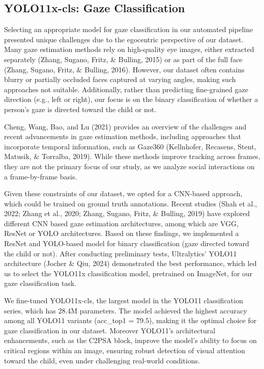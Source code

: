 \documentclass[
  man,floatsintext]{apa6}
\begin{document}
\subsection{YOLO11x-cls: Gaze Classification}\label{sup-yolo11x-cls}

Selecting an appropriate model for gaze classification in our automated pipeline presented unique challenges due to the egocentric perspective of our dataset. Many gaze estimation methods rely on high-quality eye images, either extracted separately (Zhang, Sugano, Fritz, \& Bulling, 2015) or as part of the full face (Zhang, Sugano, Fritz, \& Bulling, 2016). However, our dataset often contains blurry or partially occluded faces captured at varying angles, making such approaches not suitable. Additionally, rather than predicting fine-grained gaze direction (e.g., left or right), our focus is on the binary classification of whether a person's gaze is directed toward the child or not.

Cheng, Wang, Bao, and Lu (2021) provides an overview of the challenges and recent advancements in gaze estimation methods, including approaches that incorporate temporal information, such as Gaze360 (Kellnhofer, Recasens, Stent, Matusik, \& Torralba, 2019). While these methods improve tracking across frames, they are not the primary focus of our study, as we analyze social interactions on a frame-by-frame basis.

Given these constraints of our dataset, we opted for a CNN-based approach, which could be trained on ground truth annotations. Recent studies (Shah et al., 2022; Zhang et al., 2020; Zhang, Sugano, Fritz, \& Bulling, 2019) have explored different CNN based gaze estimation architectures, among which are VGG, ResNet or YOLO architectures. Based on these findings, we implemented a ResNet and YOLO-based model for binary classification (gaze directed toward the child or not). After conducting preliminary tests, Ultralytics' YOLO11 architecture (Jocher \& Qiu, 2024) demonstrated the best performance, which led us to select the YOLO11x classification model, pretrained on ImageNet, for our gaze classification task.

We fine-tuned YOLO11x-cls, the largest model in the YOLO11 classification series, which has 28.4M parameters. The model achieved the highest accuracy among all YOLO11 variants (acc\_top1 = 79.5), making it the optimal choice for gaze classification in our dataset. Moreover YOLO11's architectural enhancements, such as the C2PSA block, improve the model's ability to focus on critical regions within an image, ensuring robust detection of visual attention toward the child, even under challenging real-world conditions.
\end{document}

